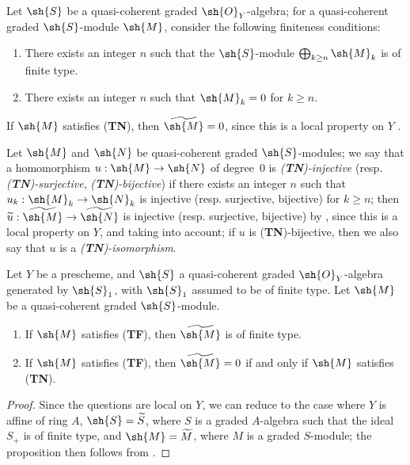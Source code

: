 \begin{env}[3.4.2]
\label{II.3.4.2}
Let $\sh{S}$ be a quasi-coherent graded $\sh{O}_Y$-algebra;
for a quasi-coherent graded $\sh{S}$-module $\sh{M}$, consider the following finiteness conditions:
\begin{enumerate}
  \item[(\textbf{TF})] There exists an integer $n$ such that the $\sh{S}$-module $\bigoplus_{k\geq n}\sh{M}_k$ is of finite type.
  \item[(\textbf{TN})] There exists an integer $n$ such that $\sh{M}_k=0$ for $k\geq n$.
\end{enumerate}

If $\sh{M}$ satisfies (\textbf{TN}), then $\widetilde{\sh{M}}=0$, since this is a local property on $Y$ .

Let $\sh{M}$ and $\sh{N}$ be quasi-coherent graded $\sh{S}$-modules;
we say that a homomorphism $u:\sh{M}\to\sh{N}$ of degree~$0$ is \emph{(\textbf{TN})-injective} (resp. \emph{(\textbf{TN})-surjective}, \emph{(\textbf{TN})-bijective}) if there exists an integer $n$ such that $u_k:\sh{M}_k\to\sh{N}_k$ is injective (resp. surjective, bijective) for $k\geq n$;
then $\widetilde{u}:\widetilde{\sh{M}}\to\widetilde{\sh{N}}$ is injective (resp. surjective, bijective) by , since this is a local property on $Y$, and taking  into account;
if $u$ is (\textbf{TN})-bijective, then we also say that $u$ is a \emph{(\textbf{TN})-isomorphism}.
\end{env}

\begin{proposition}[3.4.3]
\label{II.3.4.3}
Let $Y$ be a prescheme, and $\sh{S}$ a quasi-coherent graded $\sh{O}_Y$-algebra generated by $\sh{S}_1$, with $\sh{S}_1$ assumed to be of finite type.
Let $\sh{M}$ be a quasi-coherent graded $\sh{S}$-module.
\begin{enumerate}
  \item[(i)] If $\sh{M}$ satisfies (\textbf{TF}), then $\widetilde{\sh{M}}$ is of finite type.
  \item[(ii)] If $\sh{M}$ satisfies (\textbf{TF}), then $\widetilde{\sh{M}}=0$ if and only if $\sh{M}$ satisfies (\textbf{TN}).
\end{enumerate}
\end{proposition}

\begin{proof}
Since the questions are local on $Y$, we can reduce to the case where $Y$ is affine of ring $A$, $\sh{S}=\widetilde{S}$, where $S$ is a graded $A$-algebra such that the ideal $S_+$ is of finite type, and $\sh{M}=\widetilde{M}$, where $M$ is a graded $S$-module;
the proposition then follows from .
\end{proof}

